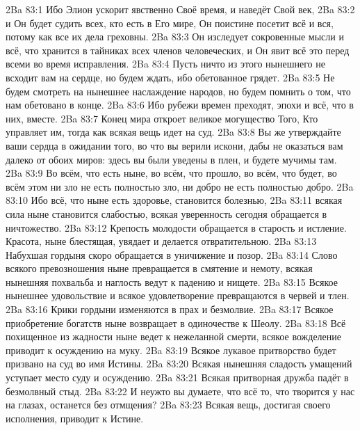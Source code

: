 \vs 2Ba 83:1
Ибо Элион ускорит явственно Своё время, и наведёт Свой век,
\vs 2Ba 83:2
и Он будет судить всех, кто есть в Его мире, Он поистине посетит всё и вся, потому как все их дела греховны.
\vs 2Ba 83:3
Он изследует сокровенные мысли и всё, что хранится в тайниках всех членов человеческих, и Он явит всё это перед всеми во время исправления.
\vs 2Ba 83:4
Пусть ничто из этого нынешнего не всходит вам на сердце, но будем ждать, ибо обетованное грядет.
\vs 2Ba 83:5
Не будем смотреть на нынешнее наслаждение народов, но будем помнить о том, что нам обетовано в конце.
\vs 2Ba 83:6
Ибо рубежи времен преходят, эпохи и всё, что в них, вместе.
\vs 2Ba 83:7
Конец мира откроет великое могущество Того, Кто управляет им, тогда как всякая вещь идет на суд.
\vs 2Ba 83:8
Вы же утверждайте ваши сердца в ожидании того, во что вы верили искони, дабы не оказаться вам далеко от обоих миров: здесь вы были уведены в плен, и будете мучимы там.
\vs 2Ba 83:9
Во всём, что есть ныне, во всём, что прошло, во всём, что будет, во всём этом ни зло не есть полностью зло, ни добро не есть полностью добро.
\vs 2Ba 83:10
Ибо всё, что ныне есть здоровье, становится болезнью,
\vs 2Ba 83:11
всякая сила ныне становится слабостью, всякая уверенность сегодня обращается в ничтожество.
\vs 2Ba 83:12
Крепость молодости обращается в старость и истление. Красота, ныне блестящая, увядает и делается отвратительною.
\vs 2Ba 83:13
Набухшая гордыня скоро обращается в уничижение и позор.
\vs 2Ba 83:14
Слово всякого превозношения ныне превращается в смятение и немоту, всякая нынешняя похвальба и наглость ведут к падению и нищете.
\vs 2Ba 83:15
Всякое нынешнее удовольствие и всякое удовлетворение превращаются в червей и тлен.
\vs 2Ba 83:16
Крики гордыни изменяются в прах и безмолвие.
\vs 2Ba 83:17
Всякое приобретение богатств ныне возвращает в одиночестве к Шеолу.
\vs 2Ba 83:18
Всё похищенное из жадности ныне ведет к нежеланной смерти, всякое вожделение приводит к осуждению на муку.
\vs 2Ba 83:19
Всякое лукавое притворство будет призвано на суд во имя Истины.
\vs 2Ba 83:20
Всякая нынешняя сладость умащений уступает место суду и осуждению.
\vs 2Ba 83:21
Всякая притворная дружба падёт в безмолвный стыд.
\vs 2Ba 83:22
И неужто вы думаете, что всё то, что творится у нас на глазах, останется без отмщения?
\vs 2Ba 83:23
Всякая вещь, достигая своего исполнения, приводит к Истине.

